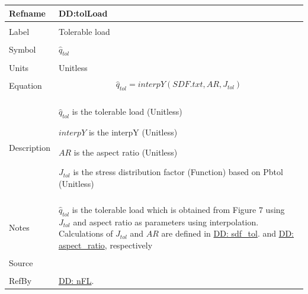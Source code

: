 \documentclass[12pt]{article}
\begin{document}
\noindent \begin{minipage}{\textwidth}
\begin{tabular}{p{} p{}}
\toprule \textbf{Refname} & \textbf{DD:tolLoad}
\label{DD:tolLoad}
\\ \midrule \\
Label & Tolerable load
        \\ \midrule \\
        Symbol & ${\hat{q}_{tol}}$
                 \\ \midrule \\
                 Units & Unitless
                         \\ \midrule \\
                         Equation & \begin{displaymath}
                                    {\hat{q}_{tol}}=interpY\left(SDF.txt,AR,{J_{tol}}\right)
                                    \end{displaymath}
                                    \\ \midrule \\
                                    Description & \begin{symbDescription}
                                                  \item{${\hat{q}_{tol}}$ is the tolerable load (Unitless)}
                                                  \item{$interpY$ is the interpY (Unitless)}
                                                  \item{$AR$ is the aspect ratio (Unitless)}
                                                  \item{${J_{tol}}$ is the stress distribution factor (Function) based on Pbtol (Unitless)}
                                                  \end{symbDescription}
                                                  \\ \midrule \\
                                                  Notes & ${\hat{q}_{tol}}$ is the tolerable load which is obtained from Figure 7 using ${J_{tol}}$ and aspect ratio as parameters using interpolation. Calculations of ${J_{tol}}$ and $AR$ are defined in \hyperref[DD:sdf.tol]{DD: sdf\_tol}. and \hyperref[DD:aspect.ratio]{DD: aspect\_ratio}, respectively
                                                          \\ \midrule \\
                                                          Source & \cite{astm2009}
                                                                   \\ \midrule \\
                                                                   RefBy & \hyperref[DD:nFL]{DD: nFL}.
\\ \bottomrule \end{tabular}
\end{minipage}
\par~
\end{document}
